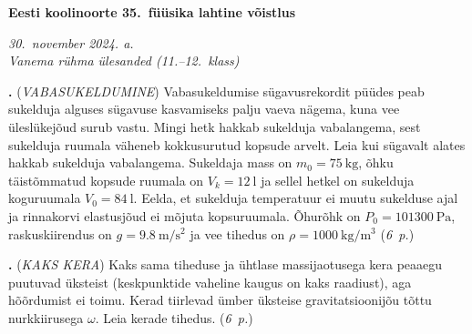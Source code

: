 \documentclass[11pt,a5paper]{article}
\newcommand{\numb}[1]{\vspace{5pt}\textbf{\large #1}}
\newcommand{\nimi}[1]{(\textsl{\small #1})}
\newcommand{\punktid}[1]{(\emph{#1~p.})}
\newcounter{ylesanne}
\newcommand{\yl}[1]{\addtocounter{ylesanne}{1}\numb{\theylesanne.} \nimi{#1} \newblock{}}
\newcommand{\autor}[1]{}%
\begin{document}
\begin{center}
  \textbf{\Large Eesti koolinoorte 35.\ füüsika lahtine võistlus} \par
  \emph{30.\ november 2024. a.\\Vanema rühma ülesanded (11.--12.\ klass)}
\end{center}

 \par



\yl{VABASUKELDUMINE}
Vabasukeldumise sügavusrekordit püüdes peab sukelduja alguses sügavuse kasvamiseks palju vaeva nägema, kuna vee üleslükejõud surub vastu. Mingi hetk hakkab sukelduja vabalangema, sest sukelduja ruumala väheneb kokkusurutud kopsude arvelt. Leia kui sügavalt alates hakkab sukelduja vabalangema. Sukeldaja mass on $m_0 = \SI{75}{\kg}$, õhku täistõmmatud kopsude ruumala on $V_{k} = \SI{12}{\l}$ ja sellel hetkel on sukelduja koguruumala $V_0 = \SI{84}{\l}$. Eelda, et sukelduja temperatuur ei muutu sukelduse ajal ja rinnakorvi elastusjõud ei mõjuta kopsuruumala. Õhurõhk on $P_0 = \SI{101300}{\Pa}$, raskuskiirendus on $g = \SI{9.8}{\m\per\s\squared}$ ja vee tihedus on $\rho = \SI{1000}{\kg\per\m\cubed}$
\punktid{6} \autor{Jarl Patrick Paide}





\yl{KAKS KERA}
Kaks sama tiheduse ja ühtlase massijaotusega kera peaaegu puutuvad üksteist (keskpunktide vaheline kaugus on kaks raadiust), aga hõõrdumist ei toimu. Kerad tiirlevad ümber üksteise gravitatsioonijõu tõttu nurkkiirusega $\omega$. Leia kerade tihedus.
\punktid{6} \autor{Jarl Patrick Paide}
\end{document}
